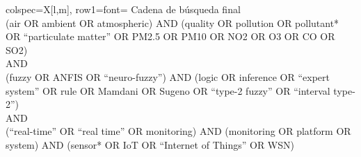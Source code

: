 \begin{longtblr}
[
 label={tab:cadena_final},
 caption={Cadena de búsqueda final utilizada en las bases de datos seleccionadas. Elaboración propia.}]{
  colspec={X[l,m]},
  row{1}={font=\bfseries}
}
Cadena de búsqueda final \\

\small
(air OR ambient OR atmospheric) AND (quality OR pollution OR pollutant* OR ``particulate matter'' OR PM2.5 OR PM10 OR NO2 OR O3 OR CO OR SO2) \\
AND \\
(fuzzy OR ANFIS OR ``neuro-fuzzy'') AND (logic OR inference OR ``expert system'' OR rule OR Mamdani OR Sugeno OR ``type-2 fuzzy'' OR ``interval type-2'') \\
AND \\
(``real-time'' OR ``real time'' OR monitoring) AND (monitoring OR platform OR system) AND (sensor* OR IoT OR ``Internet of Things'' OR WSN) \\

\end{longtblr}
